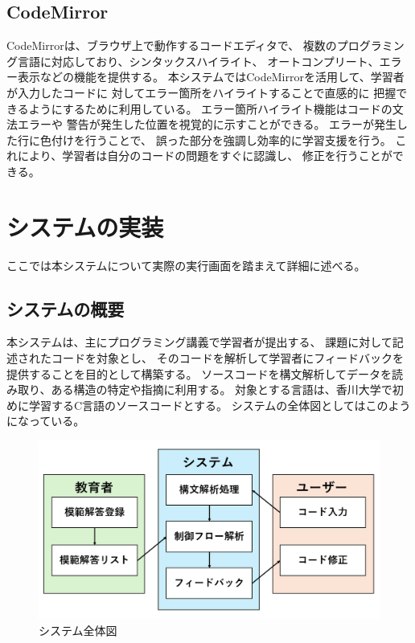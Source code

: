 \documentclass{cssspaper}
\begin{document}
        \section{CodeMirror}
        CodeMirrorは、ブラウザ上で動作するコードエディタで、
        複数のプログラミング言語に対応しており、シンタックスハイライト、
        オートコンプリート、エラー表示などの機能を提供する。
        本システムではCodeMirrorを活用して、学習者が入力したコードに
        対してエラー箇所をハイライトすることで直感的に
        把握できるようにするために利用している。
        エラー箇所ハイライト機能はコードの文法エラーや
        警告が発生した位置を視覚的に示すことができる。
        エラーが発生した行に色付けを行うことで、
        誤った部分を強調し効率的に学習支援を行う。
        これにより、学習者は自分のコードの問題をすぐに認識し、
        修正を行うことができる。

    \chapter{システムの実装}
    ここでは本システムについて実際の実行画面を踏まえて詳細に述べる。
        \section{システムの概要}
        本システムは、主にプログラミング講義で学習者が提出する、
        課題に対して記述されたコードを対象とし、
        そのコードを解析して学習者にフィードバックを提供することを目的として構築する。
        ソースコードを構文解析してデータを読み取り、ある構造の特定や指摘に利用する。
        対象とする言語は、香川大学で初めに学習するC言語のソースコードとする。
        システムの全体図としてはこのようになっている。

        \begin{figure}[h]
            \centering
            \includegraphics[width=13cm]{system.png}
            \caption{システム全体図}
            \label{fig:system}
        \end{figure}
\end{document}
